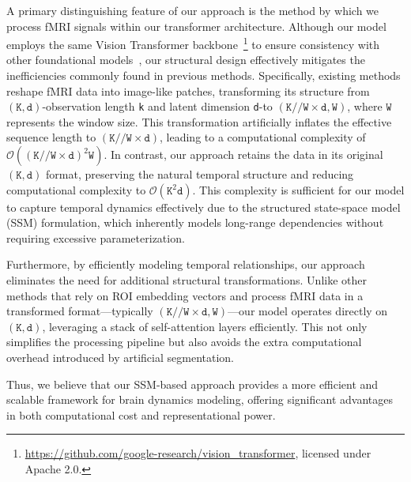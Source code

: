 A primary distinguishing feature of our approach is the method by which we process fMRI signals within our transformer architecture. Although our model employs the same Vision Transformer backbone~\citep{alexey2020image}\footnote{\url{https://github.com/google-research/vision_transformer}, licensed under Apache 2.0.} to ensure consistency with other foundational models~\citep{caro2024brainlm, dong2024brain}, our structural design effectively mitigates the inefficiencies commonly found in previous methods. Specifically, existing methods reshape fMRI data into image-like patches, transforming its structure from $(\texttt{K}, \texttt{d})$-observation length \texttt{k} and latent dimension \texttt{d}-to $(\texttt{K} // \texttt{W} \times \texttt{d}, \texttt{W})$, where $\texttt{W}$ represents the window size. This transformation artificially inflates the effective sequence length to $(\texttt{K} // \texttt{W} \times \texttt{d})$, leading to a computational complexity of $\mathcal{O}((\texttt{K} // \texttt{W} \times \texttt{d})^2 \texttt{W})$. In contrast, our approach retains the data in its original $(\texttt{K}, \texttt{d})$ format, preserving the natural temporal structure and reducing computational complexity to $\mathcal{O}(\texttt{K}^2 \texttt{d})$. This complexity is sufficient for our model to capture temporal dynamics effectively due to the structured state-space model (SSM) formulation, which inherently models long-range dependencies without requiring excessive parameterization.

Furthermore, by efficiently modeling temporal relationships, our approach eliminates the need for additional structural transformations. Unlike other methods that rely on ROI embedding vectors and process fMRI data in a transformed format—typically $(\texttt{K} // \texttt{W} \times \texttt{d}, \texttt{W})$—our model operates directly on $(\texttt{K}, \texttt{d})$, leveraging a stack of self-attention layers efficiently. This not only simplifies the processing pipeline but also avoids the extra computational overhead introduced by artificial segmentation.

Thus, we believe that our SSM-based approach provides a more efficient and scalable framework for brain dynamics modeling, offering significant advantages in both computational cost and representational power.




